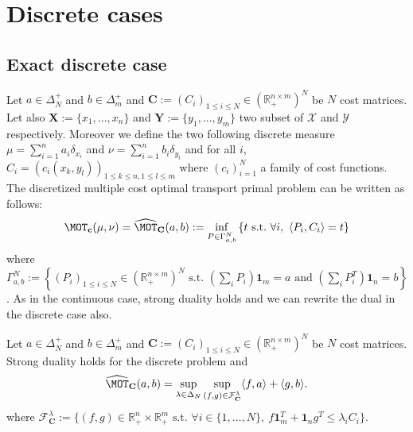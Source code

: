\section{Discrete cases}
\label{sec:discrete}

\subsection{Exact discrete case}
\label{dis:exact}
Let $a\in\Delta_N^{+}$ and $b\in\Delta^+_m$ and $\mathbf{C}:=(C_i)_{1\leq i\leq N}\in\left(\mathbb{R}_+^{n\times m}\right)^N$ be $N$ cost matrices. Let also $\mathbf{X}:=\{x_1,...,x_n\}$ and $\mathbf{Y}:=\{y_1,...,y_m\}$ two subset of $\mathcal{X}$ and $\mathcal{Y}$ respectively. Moreover we define the two following discrete measure $\mu=\sum_{i=1}^n a_i \delta_{x_i}$ and $\nu=\sum_{i=1}^n b_i \delta_{y_i}$ and for all $i$, $C_i = (c_i(x_k,y_l))_{1\leq k\leq n,1\leq l\leq m}$ where $(c_i)_{i=1}^N$ a family of cost functions. The discretized multiple cost optimal transport primal problem can be written as follows:
\begin{align*}
\MOT_{\mathbf{c}}(\mu,\nu)=\widehat{\MOT}_{\textbf{C}}(a,b) := \inf_{P\in\Gamma_{a,b}^N} \left\{t ~\mathrm{s.t.}~\forall i,~\langle P_i,C_i\rangle=t\right\}
\end{align*}
where $\Gamma_{a,b}^N:=\left\{(P_i)_{1\leq i\leq N}\in\left(\mathbb{R}_+^{n\times m}\right)^N\text{ s.t. } (\sum_i P_i)\mathbf{1}_m=a \text{ and } (\sum_i P_i^T)\mathbf{1}_n=b \right\}$. 
As in the continuous case, strong duality holds and we can rewrite the dual in the discrete case also.
\begin{prop}
\label{prop:discrete-dual}

Let $a\in\Delta_N^{+}$ and $b\in\Delta^+_m$ and $\mathbf{C}:=(C_i)_{1\leq i\leq N}\in\left(\mathbb{R}_+^{n\times m}\right)^N$ be $N$ cost matrices. Strong duality holds for the discrete problem and
\begin{align*}
\widehat{\MOT}_{\mathbf{C}}(a,b)=\sup_{\lambda\in\Delta_N}\sup\limits_{(f,g)\in\mathcal{F}^{\lambda}_{\mathbf{C}}} \langle f,a\rangle+\langle g,b\rangle.
\end{align*}
where $\mathcal{F}^{\lambda}_{\mathbf{C}}:=\{(f,g)\in\mathbb{R}_{+}^n\times\mathbb{R}_{+}^m\text{ s.t. }\forall i\in\{1,...,N\},~ f\mathbf{1}_m^T+\mathbf{1}_n g^T\leq\lambda_i C_i\}$.
\end{prop}



